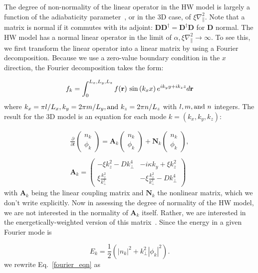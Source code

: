 \documentclass[letter,scriptaddress,twocolumn, prl,showkeys]{revtex4}
\def\beq{\begin{equation}}
\def\eeq{\end{equation}}
\def\beqar{\begin{eqnarray}}
\def\eeqar{\end{eqnarray}}
\def\grad{\nabla}
\newcommand{\gradpar}{\grad_\parallel}
\begin{document}
The degree of non-normality of the linear operator in the HW model is largely a function of the adiabaticity parameter~\cite{camargo1998}, or in the 3D case, of $\xi \gradpar^2$. 
Note that a matrix is normal if it commutes with its adjoint: $\mathbf{D} \mathbf{D}^\dagger = \mathbf{D}^\dagger \mathbf{D}$ for $\mathbf{D}$ normal. 
The HW model has a normal linear operator in the limit of $\alpha, \xi \gradpar^2 \to \infty$. 
To see this, we first transform the linear operator into a linear matrix by using a Fourier decomposition. Because we use a zero-value boundary condition in the $x$ direction, the
Fourier decomposition takes the form:

\beq
\label{fourier_form}
f_k = \int_0^{L_x,L_y,L_z} f(\mathbf{r}) \ {\rm sin} \left( k_x x \right) e^{i k_y y + i k_z z} d\mathbf{r}
\eeq
where $k_x = \pi l/L_x, k_y = 2 \pi m/L_y, {\rm and } \ k_z = 2 \pi n/L_z$ with $l, m, {\rm and } \ n$ integers.
The result for the 3D model is an equation for each mode $k = (k_x,k_y,k_z)$:

\beqar
\label{fourier_eqn}
\frac{\partial}{\partial t} \left( \begin{array}{cc} n_k \\ \phi_k \end{array} \right) = \mathbf{A}_k \left( \begin{array}{cc} n_k \\ \phi_k \end{array} \right) + \mathbf{N}_k \left( \begin{array}{cc} n_k \\ \phi_k \end{array} \right), \\ \nonumber \\
\label{A_k}
\mathbf{A}_k = \left( \begin{array}{cc} -\xi k_z^2 - D k_\perp^4 & -i \kappa k_y + \xi k_z^2 \\  \xi \frac{k_z^2}{k_\perp^2} & - \xi \frac{k_z^2}{k_\perp^2} - D k_\perp^4\end{array} \right)
\eeqar
with $\mathbf{A}_k$ being the linear coupling matrix and $\mathbf{N}_k$ the nonlinear matrix, which we don't write explicitly. 
Now in assessing the degree of normality of the HW model, we are not interested in the normality of $\mathbf{A}_k$ itself. 
Rather, we are interested in the energetically-weighted version of this matrix~\cite{camargo1998,schmid2007,camporeale2010}. Since the energy in a given Fourier mode is

\beq
\label{en_def}
E_k =  \frac{1}{2} \left( |n_k|^2 + k_\perp^2 |\phi_k|^2 \right).
\eeq
we rewrite Eq.~\ref{fourier_eqn} as
\end{document}
